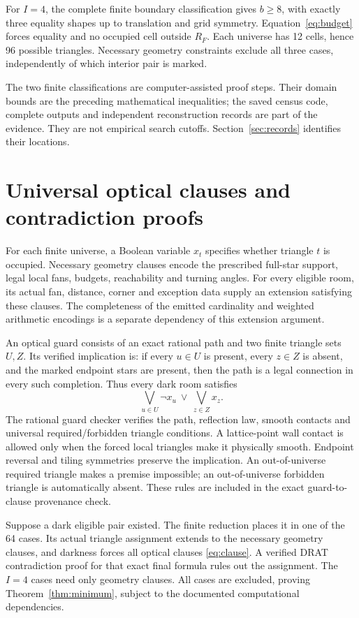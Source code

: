 \documentclass[11pt]{article}
\theoremstyle{definition}
\begin{document}
For $I=4$, the complete finite boundary classification gives $b\ge8$, with exactly three equality shapes up to translation and grid symmetry. Equation~\eqref{eq:budget} forces equality and no occupied cell outside $R_F$. Each universe has 12 cells, hence 96 possible triangles. Necessary geometry constraints exclude all three cases, independently of which interior pair is marked.

The two finite classifications are computer-assisted proof steps. Their domain bounds are the preceding mathematical inequalities; the saved census code, complete outputs and independent reconstruction records are part of the evidence. They are not empirical search cutoffs. Section~\ref{sec:records} identifies their locations.

\section{Universal optical clauses and contradiction proofs}\label{sec:certificates}
For each finite universe, a Boolean variable $x_t$ specifies whether triangle $t$ is occupied. Necessary geometry clauses encode the prescribed full-star support, legal local fans, budgets, reachability and turning angles. For every eligible room, its actual fan, distance, corner and exception data supply an extension satisfying these clauses. The completeness of the emitted cardinality and weighted arithmetic encodings is a separate dependency of this extension argument.

An optical guard consists of an exact rational path and two finite triangle sets $U,Z$. Its verified implication is: if every $u\in U$ is present, every $z\in Z$ is absent, and the marked endpoint stars are present, then the path is a legal connection in every such completion. Thus every dark room satisfies
\begin{equation}\label{eq:clause}
 \bigvee_{u\in U}\neg x_u\ \vee\ \bigvee_{z\in Z}x_z.
\end{equation}
The rational guard checker verifies the path, reflection law, smooth contacts and universal required/forbidden triangle conditions. A lattice-point wall contact is allowed only when the forced local triangles make it physically smooth. Endpoint reversal and tiling symmetries preserve the implication. An out-of-universe required triangle makes a premise impossible; an out-of-universe forbidden triangle is automatically absent. These rules are included in the exact guard-to-clause provenance check.

Suppose a dark eligible pair existed. The finite reduction places it in one of the 64 cases. Its actual triangle assignment extends to the necessary geometry clauses, and darkness forces all optical clauses \eqref{eq:clause}. A verified DRAT contradiction proof for that exact final formula rules out the assignment. The $I=4$ cases need only geometry clauses. All cases are excluded, proving Theorem~\ref{thm:minimum}, subject to the documented computational dependencies.
\end{document}
